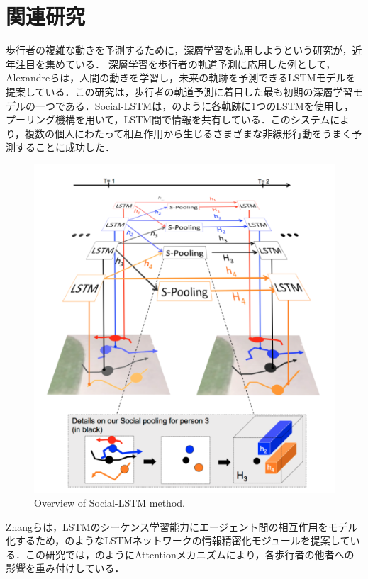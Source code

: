 
\section{関連研究}
歩行者の複雑な動きを予測するために，深層学習を応用しようという研究が，近年注目を集めている．
深層学習を歩行者の軌道予測に応用した例として，Alexandreら\cite{s-lstm}は，人間の動きを学習し，未来の軌跡を予測できるLSTMモデルを提案している．この研究は，歩行者の軌道予測に着目した最も初期の深層学習モデルの一つである．Social-LSTMは，のように各軌跡に1つのLSTMを使用し，プーリング機構を用いて，LSTM間で情報を共有している．このシステムにより，複数の個人にわたって相互作用から生じるさまざまな非線形行動をうまく予測することに成功した．

\begin{figure}[hbtp]
     \centering
    \includegraphics[keepaspectratio, scale=0.56]
         {images/s-lstm.png}
    \caption{Overview of Social-LSTM method.\protect\footnotemark[1]}
    \label{Fig:s-lstm}
\end{figure}

\protect{}

Zhangら\cite{sr-lstm}は，LSTMのシーケンス学習能力にエージェント間の相互作用をモデル化するため，のようなLSTMネットワークの情報精密化モジュールを提案している．この研究では，のようにAttentionメカニズムにより，各歩行者の他者への影響を重み付けしている．

